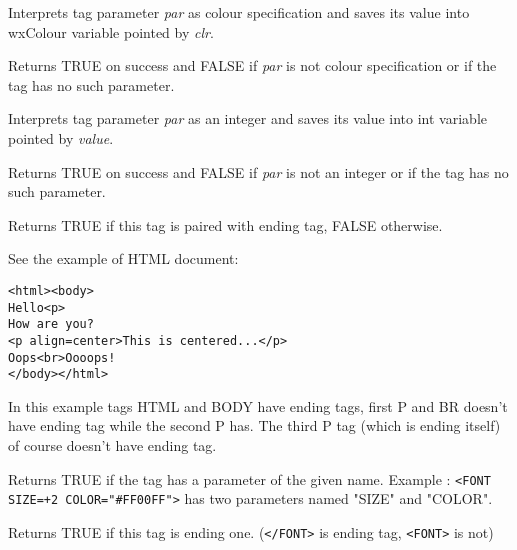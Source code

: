 
Interprets tag parameter {\it par} as colour specification and saves its value
into wxColour variable pointed by {\it clr}.

Returns TRUE on success and FALSE if {\it par} is not colour specification or
if the tag has no such parameter.

\label{wxhtmltaggetparamasint}


Interprets tag parameter {\it par} as an integer and saves its value
into int variable pointed by {\it value}.

Returns TRUE on success and FALSE if {\it par} is not an integer or
if the tag has no such parameter.

\label{wxhtmltaghasending}


Returns TRUE if this tag is paired with ending tag, FALSE otherwise.

See the example of HTML document:

\begin{verbatim}
<html><body>
Hello<p>
How are you?
<p align=center>This is centered...</p>
Oops<br>Oooops!
</body></html>
\end{verbatim}

In this example tags HTML and BODY have ending tags, first P and BR 
doesn't have ending tag while the second P has. The third P tag (which
is ending itself) of course doesn't have ending tag.

\label{wxhtmltaghasparam}


Returns TRUE if the tag has a parameter of the given name. 
Example : {\tt <FONT SIZE=+2 COLOR="\#FF00FF">} has two parameters named
"SIZE" and "COLOR".



\label{wxhtmltagisending}


Returns TRUE if this tag is ending one.
({\tt </FONT>} is ending tag, {\tt <FONT>} is not)

